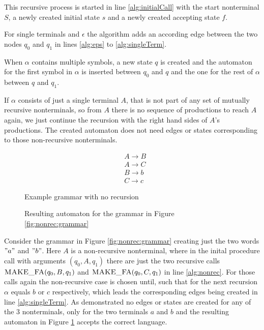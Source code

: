 This recursive process is started in line \ref{alg:initialCall} with the start nonterminal $S$, a newly created initial state $s$ and a newly created accepting state $f$.

For single terminals and $\epsilon$ the algorithm adds an according edge between the two nodes $q_0$ and $q_1$ in lines \ref{alg:eps} to \ref{alg:singleTerm}.

When $\alpha$ contains multiple symbols, a new state $q$ is created and the automaton for the first symbol in $\alpha$ is inserted between $q_0$ and $q$ and the one for the rest of $\alpha$ between $q$ and $q_1$. 

If $\alpha$ consists of just a single terminal $A$, that is not part of any set of mutually recursive nonterminals, so from $A$ there is no sequence of productions to reach $A$ again, we just continue the recursion with the right hand sides of $A$'s productions. The created automaton does not need edges or states corresponding to those non-recursive nonterminals. 


\begin{figure}[h]
	\begin{minipage}[b]{.45\linewidth}
		\begin{align*}
			&A \rightarrow B\\
			&A \rightarrow C\\
			&B \rightarrow b\\
			&C \rightarrow c
		\end{align*}
		\caption{Example grammar with no recursion}
		\label{fig:nonrec:grammar}
	\end{minipage}
	\hfill
	\begin{minipage}[b]{.45\linewidth}
		\caption{Resulting automaton for the grammar in Figure \ref{fig:nonrec:grammar}}
		\label{fig:nonrec:automaton}
	\end{minipage}
\end{figure}


Consider the grammar in Figure \ref{fig:nonrec:grammar} creating just the two words $"a"$ and $"b"$. Here $A$ is a non-recursive nonterminal, where in the inital procedure call with arguments $(q_0, A, q_1)$ there are just the two recursive calls $\textproc{MAKE\_FA}(q_0, B, q_1)$ and $\textproc{MAKE\_FA}(q_0, C, q_1)$ in line \ref{alg:nonrec}. For those calls again the non-recursive case is chosen until, such that for the next recursion $\alpha$ equals $b$ or $c$ respectively, which leads the corresponding edges being created in line \ref{alg:singleTerm}. As demonstrated no edges or states are created for any of the 3 nonterminals, only for the two terminals $a$ and $b$ and the resulting automaton in Figure \ref{fig:nonrec:automaton} accepts the correct language.

